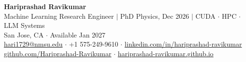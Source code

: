 \documentclass[11pt]{article}
\begin{document}
\begin{center}
  \textbf{\Huge Hariprashad Ravikumar} \\[0.6em]
  Machine Learning Research Engineer $|$ PhD Physics, Dec 2026 $|$ CUDA $\cdot$ HPC $\cdot$ LLM Systems \\[0.3em]
  San Jose, CA $\cdot$ Available Jan 2027 \\[0.4em]
  \href{mailto:hari1729@nmsu.edu}{hari1729@nmsu.edu} $\cdot$ +1 575-249-9610 $\cdot$ \href{https://www.linkedin.com/in/hariprashad-ravikumar}{linkedin.com/in/hariprashad-ravikumar} \\
  \href{https://github.com/Hariprashad-Ravikumar}{github.com/Hariprashad-Ravikumar} $\cdot$ \href{https://hariprashad-ravikumar.github.io}{hariprashad-ravikumar.github.io}
\end{center}

\vspace{0.3em}
\end{document}
